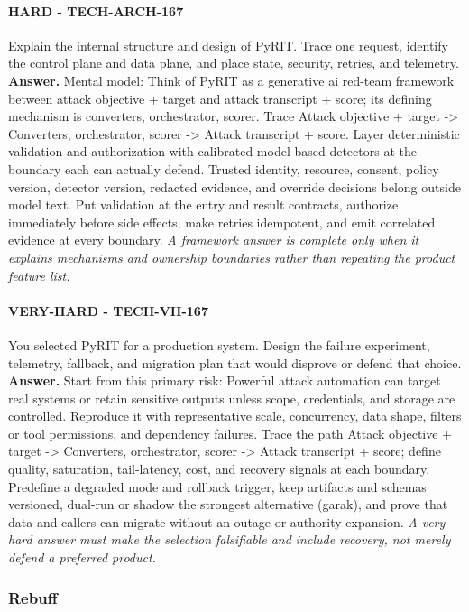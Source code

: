 \paragraph{HARD - TECH-ARCH-167} Explain the internal structure and design of PyRIT. Trace one request, identify the control plane and data plane, and place state, security, retries, and telemetry.
\textbf{Answer.} Mental model: Think of PyRIT as a generative ai red-team framework between attack objective + target and attack transcript + score; its defining mechanism is converters, orchestrator, scorer. Trace Attack objective + target -> Converters, orchestrator, scorer -> Attack transcript + score. Layer deterministic validation and authorization with calibrated model-based detectors at the boundary each can actually defend. Trusted identity, resource, consent, policy version, detector version, redacted evidence, and override decisions belong outside model text. Put validation at the entry and result contracts, authorize immediately before side effects, make retries idempotent, and emit correlated evidence at every boundary.
\textit{A framework answer is complete only when it explains mechanisms and ownership boundaries rather than repeating the product feature list.}
\paragraph{VERY-HARD - TECH-VH-167} You selected PyRIT for a production system. Design the failure experiment, telemetry, fallback, and migration plan that would disprove or defend that choice.
\textbf{Answer.} Start from this primary risk: Powerful attack automation can target real systems or retain sensitive outputs unless scope, credentials, and storage are controlled. Reproduce it with representative scale, concurrency, data shape, filters or tool permissions, and dependency failures. Trace the path Attack objective + target -> Converters, orchestrator, scorer -> Attack transcript + score; define quality, saturation, tail-latency, cost, and recovery signals at each boundary. Predefine a degraded mode and rollback trigger, keep artifacts and schemas versioned, dual-run or shadow the strongest alternative (garak), and prove that data and callers can migrate without an outage or authority expansion.
\textit{A very-hard answer must make the selection falsifiable and include recovery, not merely defend a preferred product.}
\subsubsection*{Rebuff}
